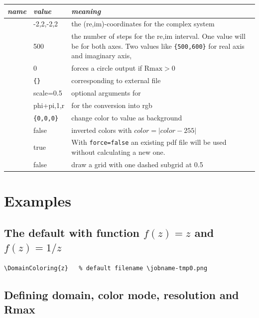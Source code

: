 \documentclass[fontsize=11pt,english,BCOR=10mm,DIV=12,bibliography=totoc,parskip=false,headings=small,
    headinclude=false,footinclude=false,oneside]{pst-doc}
\begin{document}
\noindent
\begin{xltabular}{\linewidth}{@{} >{\ttfamily}l l X @{}}\\\toprule
\emph{name} & \emph{value} &\emph{meaning}\\\midrule
{} & {-2,2,-2,2} & the (re,im)-coordinates for the complex system\\
 & 500 & the number of steps for the re,im interval. One value will be for
both axes. Two values like \verb|{500,600}| for real axis and imaginary axis,\\
 & 0 & forces a circle output if $\text{Rmax}>0$ \\ 
 & \texttt{\{\}} & corresponding to external file\\
 &scale=0.5 & optional arguments for \\
 & {phi+pi,1,r} & for the conversion into rgb\\
 & \texttt{\{0,0,0\}} & change color to value as background\\
 & false & inverted colors with $color=|color-255|$\\
 & true & With \texttt{force=false} an existing pdf file will be used
without calculating a new one.\\
 & false & draw a grid with one dashed subgrid at 0.5\\
\bottomrule
\end{xltabular}




\section{Examples}

\subsection{The default with function $f(z)=z$ and $f(z)=1/z$}
\begin{lstlisting}
\DomainColoring{z}   % default filename \jobname-tmp0.png
\end{lstlisting}

\noindent
{}%



\subsection{Defining domain, color mode, resolution and Rmax}
\end{document}
